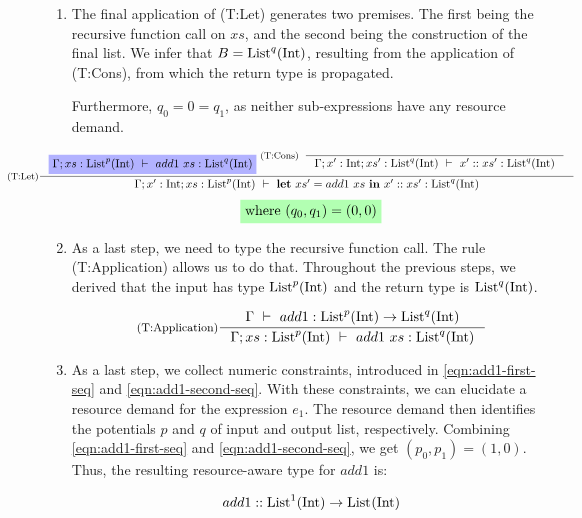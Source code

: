 \begin{example}
\begin{enumerate}[label=Step \Roman*:]
   \item The final application of (T:Let) generates two premises. The first being the recursive function call on \(xs\), and the second being the construction of the final list. We infer that \(B = \text{List}^{q}(\text{Int})\), resulting from the application of (T:Cons), from which the return type is propagated. 

Furthermore, \(q_0 = 0 = q_1\), as neither sub-expressions have any resource demand.

\[
   \hspace*{-2cm}
   \inference[(T:Let)]
   {
      \typingHighlight{\typing{\Gamma;xs:\ralist{p}{\typeint}}{add1~xs}{\ralist{q}{\typeint}}}
      \inference[(T:Cons)]
      {}
      {
         \typing{\Gamma;x':\typeint;xs':\ralist{q}{\typeint}}{\cons{x'}{xs'}}{\ralist{q}{\typeint}}
      }
   }
   {
      \typing{\Gamma;x':\typeint;xs:\ralist{p}{\typeint}}{\letexp{xs'}{add1~xs}{\cons{x'}{xs'}}}{\ralist{q}{\typeint}}
   }
\]
\begin{align}
   \constraintHighlight{\text{where } (q_0, q_1) = (0, 0)} \label{eqn:add1-second-seq}
\end{align}

   \item As a last step, we need to type the recursive function call. The rule (T:Application) allows us to do that. Throughout the previous steps, we derived that the input has type \(\text{List}^{p}(\text{Int})\) and the return type is \(\text{List}^{q}(\text{Int})\). 

\[
   \inference[(T:Application)]
   {
      \typing{\Gamma}{add1}{\ralist{p}{\typeint} \to \ralist{q}{\typeint}}
   }
   {
      \typing{\Gamma;xs:\ralist{p}{\typeint}}{add1~xs}{\ralist{q}{\typeint}}
   }
\]

\item As a last step, we collect numeric constraints, introduced in \cref{eqn:add1-first-seq} and \cref{eqn:add1-second-seq}. With these constraints, we can elucidate a resource demand for the expression \(e_1\). The resource demand then identifies the potentials \(p\) and \(q\) of input and output list, respectively. Combining \cref{eqn:add1-first-seq} and \cref{eqn:add1-second-seq}, we get \((p_0, p_1) = (1, 0)\). Thus, the resulting resource-aware type for \(add1\) is:

\[
   add1 :: \text{List}^{1}(\text{Int}) \to \text{List}^{}(\text{Int}) ^{}_{}
\]
\end{enumerate}
\end{example}


